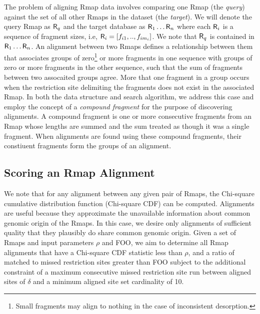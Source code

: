The problem of aligning Rmap data involves comparing one Rmap (the \emph{query}) against the set of all other Rmaps in the dataset (the \emph{target}). We will denote the query Rmap as $\mbox{\rm {\sf R}}_q$ and the target database as $\mbox{\rm {\sf R}}_1 \ldots \mbox{\rm {\sf R}}_n$  where each $\mbox{\rm {\sf R}}_i$  is a sequence of fragment sizes, i.e, $\mbox{\rm {\sf R}}_i = [f_{i1}, .., f_{im_i}]$.  We note that $\mbox{\rm {\sf R}}_q$ is contained in $\mbox{\rm {\sf R}}_1 \ldots \mbox{\rm {\sf R}}_n$.  An alignment between two Rmaps defines a relationship between them that associates groups of zero\footnote{Small fragments may align to nothing in the case of inconsistent desorption.} or more fragments in one sequence with groups of zero or more fragments in the other sequence, such that the sum of fragments between two assocaited groups agree.  More that one fragment in a group occurs when the restriction site delimiting the fragments does not exist in the associated Rmap.  In both the data structure and search algorithm, we address this case and employ the concept of a \emph{compound fragment} for the purpose of discovering alignments. A compound fragment is one or more consecutive fragments from an Rmap whose lengths are summed and the sum treated as though it was a single fragment.  When alignments are found using these compound fragments, their constiuent fragments form the groups of an alignment.

\subsection{Scoring an Rmap Alignment}


We note that for any alignment between any given pair of Rmaps, the Chi-square cumulative distribution function (Chi-square CDF) can be computed.   Alignments are useful because they approximate the unavailable information about common genomic origin of the Rmaps.  In this case, we desire only alignments of sufficient quality that they plausibly do share common genomic origin.  Given a set of Rmaps and input parameters $\rho$ and FOO, we aim to determine all Rmap alignments that have a Chi-square CDF statistic less than $\rho$, and a ratio of matched to missed restriction sites greater than FOO subject to the additional constraint of a maximum consecutive missed restriction site run between aligned sites of $\delta$ and a minimum aligned site set cardinality of 10. 

